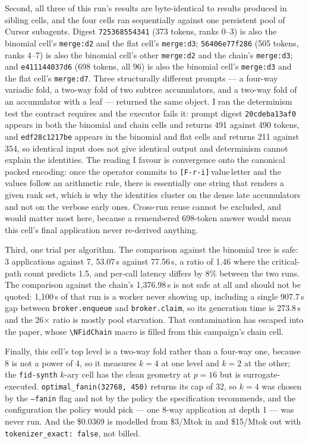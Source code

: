 \documentclass[11pt]{article}
\begin{document}
Second, all three of this run's results are byte-identical to results produced in sibling
cells, and the four cells ran sequentially against one persistent pool of Cursor subagents.
Digest \texttt{725368554341} (373 tokens, ranks 0--3) is also the binomial cell's
\texttt{merge:d2} and the flat cell's \texttt{merge:d3}; \texttt{56406e77f286} (505 tokens,
ranks 4--7) is also the binomial cell's other \texttt{merge:d2} and the chain's
\texttt{merge:d3}; and \texttt{e411144037d6} (698 tokens, all 96) is also the binomial
cell's \texttt{merge:d3} and the flat cell's \texttt{merge:d7}. Three structurally
different prompts --- a four-way variadic fold, a two-way fold of two subtree accumulators,
and a two-way fold of an accumulator with a leaf --- returned the same object. I ran the
determinism test the contract requires and the executor fails it: prompt digest
\texttt{20cdeba13af0} appears in both the binomial and chain cells and returns 491 against
490 tokens, and \texttt{edf28c1217be} appears in the binomial and flat cells and returns
211 against 354, so identical input does not give identical output and determinism cannot
explain the identities. The reading I favour is convergence onto the canonical packed
encoding: once the operator commits to \texttt{[F-r-i]}\,value\,letter and the values follow
an arithmetic rule, there is essentially one string that renders a given rank set, which is
why the identities cluster on the dense late accumulators and not on the verbose early
ones. Cross-run reuse cannot be excluded, and would matter most here, because a remembered
698-token answer would mean this cell's final application never re-derived anything.

Third, one trial per algorithm. The comparison against the binomial tree is safe: 3
applications against 7, 53.07\,s against 77.56\,s, a ratio of 1.46 where the critical-path
count predicts 1.5, and per-call latency differs by 8\% between the two runs. The
comparison against the chain's 1{,}376.98\,s is not safe at all and should not be quoted:
1{,}100\,s of that run is a worker never showing up, including a single 907.7\,s gap
between \texttt{broker.enqueue} and \texttt{broker.claim}, so its generation time is
273.8\,s and the 26$\times$ ratio is mostly pool starvation. That contamination has escaped
into the paper, whose \texttt{\textbackslash NFidChain} macro is filled from this
campaign's chain cell.

Finally, this cell's top level is a two-way fold rather than a four-way one, because 8 is
not a power of 4, so it measures $k=4$ at one level and $k=2$ at the other; the
\texttt{fid-synth} $k$-ary cell has the clean geometry at $p=16$ but is surrogate-executed.
\texttt{optimal\_fanin(32768, 450)} returns its cap of 32, so $k=4$ was chosen by the
\texttt{--fanin} flag and not by the policy the specification recommends, and the
configuration the policy would pick --- one 8-way application at depth 1 --- was never run.
And the \$0.0369 is modelled from \$3/Mtok in and \$15/Mtok out with
\texttt{tokenizer\_exact: false}, not billed.
\end{document}
